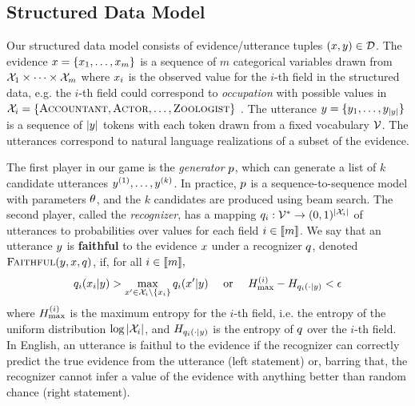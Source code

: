   \subsection{Structured Data Model}
  \label{sec:struct_data_model}

  Our structured data model consists of evidence/utterance tuples $(x, y)\in
  \mathcal{D}$.
   The evidence $x = \{x_1, \ldots, x_m\}$
   is a sequence of $m$ categorical variables drawn from  
   $\mathcal{X}_1 \times \cdots \times \mathcal{X}_{m}$ where $x_i$ is the observed value for the 
   $i$-th field in the structured data, e.g. the $i$-th field could correspond 
   to \textit{occupation} with possible values
   in $\mathcal{X}_i = 
   \{ \textsc{Accountant}, \textsc{Actor},
    \ldots, \textsc{Zoologist} \}$ .
The utterance $y = \{y_1,\ldots, 
y_{|y|}\}$ is a 
  sequence of $|y|$ tokens with each token drawn from a fixed 
  vocabulary $\mathcal{V}$. The utterances correspond to natural language 
  realizations of a subset
  of the evidence.

  The first player in our game is the \textit{generator} $p$, which can 
  generate a list of $k$ candidate utterances $y^{(1)},\ldots,
  y^{(k)}$. In practice, $p$ is a sequence-to-sequence 
  model \citep{bahdanau2014neural} with parameters $\theta$, and the $k$ 
candidates are produced using beam search.
 The second player, called the \textit{recognizer}, has a mapping
 $q_i : \mathcal{V}^* \rightarrow (0,1)^{|\mathcal{X}_i|}$ of utterances to
 probabilities over values for each field
 $i \in \llbracket m \rrbracket$. We say that an utterance $y$ is \textbf{faithful}
 to the evidence $x$ under a recognizer $q$, 
denoted $\textsc{Faithful}(y,x,q)$, if, for all $i\in \llbracket m \rrbracket,$
\[ q_i(x_i|y) >
 \max_{x^\prime \in \mathcal{X}_i \setminus \{x_i\}}
  q_i(x^\prime|y) 
  \quad \textrm{ or } \quad  
  H^{(i)}_{\max} - H_{q_i(\cdot|y)} < \epsilon\]
where $H^{(i)}_{\max}$ is the maximum entropy for the $i$-th field,
i.e. the entropy of the uniform distribution 
$\log |\mathcal{X}_i|$, and $H_{q_i(\cdot|y)}$ 
is the entropy of $q$ over the $i$-th field. In English, 
an utterance is faithul to the evidence if the recognizer can correctly
predict the true evidence from the utterance (left statement) or, barring that,
the recognizer cannot infer a value of the evidence with
anything better than random chance (right statement).

